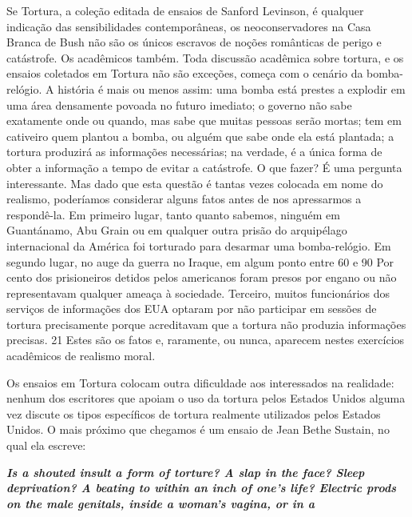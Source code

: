 Se Tortura, a coleção editada de ensaios de Sanford Levinson, é qualquer indicação das sensibilidades contemporâneas, os neoconservadores na Casa Branca de Bush não são os únicos escravos de noções românticas de perigo e catástrofe. Os acadêmicos também. Toda discussão acadêmica sobre tortura, e os ensaios coletados em Tortura não são exceções, começa com o cenário da bomba-relógio. A história é mais ou menos assim: uma bomba está prestes a explodir em uma área densamente povoada no futuro imediato; o governo não sabe exatamente onde ou quando, mas sabe que muitas pessoas serão mortas; tem em cativeiro quem plantou a bomba, ou alguém que sabe onde ela está plantada; a tortura produzirá as informações necessárias; na verdade, é a única forma de obter a informação a tempo de evitar a catástrofe. O que fazer? É uma pergunta interessante. Mas dado que esta questão é tantas vezes colocada em nome do realismo, poderíamos considerar alguns fatos antes de nos apressarmos a respondê-la. Em primeiro lugar, tanto quanto sabemos, ninguém em Guantánamo, Abu Grain ou em qualquer outra prisão do arquipélago internacional da América foi torturado para desarmar uma bomba-relógio. Em segundo lugar, no auge da guerra no Iraque, em algum ponto entre
 {\color{blue} 60}  
e
 {\color{blue} 90}  
Por cento dos prisioneiros detidos pelos americanos foram presos por engano ou não representavam qualquer ameaça à sociedade. Terceiro, muitos funcionários dos serviços de informações dos EUA optaram por não participar em sessões de tortura precisamente porque acreditavam que a tortura não produzia informações precisas.
 {\color{blue} 21}  
Estes são os fatos e, raramente, ou nunca, aparecem nestes exercícios acadêmicos de realismo moral.
 
\par
 
Os ensaios em Tortura colocam outra dificuldade aos interessados ​​na realidade: nenhum dos escritores que apoiam o uso da tortura pelos Estados Unidos alguma vez discute os tipos específicos de tortura realmente utilizados pelos Estados Unidos. O mais próximo que chegamos é um ensaio de Jean Bethe Sustain, no qual ela escreve:
 
\par
 

 \textbf{\textit{Is a shouted insult a form of torture? A slap in the face? Sleep deprivation? A beating to within an inch of one’s life? Electric prods on the male genitals, inside a woman’s vagina, or in a} }  
 
 
\par
 

